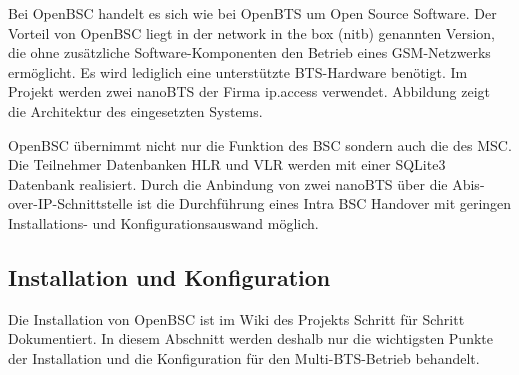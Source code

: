 \label{sec:openbsc}

Bei OpenBSC handelt es sich wie bei OpenBTS um Open Source Software. Der Vorteil von OpenBSC liegt in der network in the box (nitb) genannten Version, die ohne zusätzliche Software-Komponenten den Betrieb eines GSM-Netzwerks ermöglicht. Es wird lediglich eine unterstützte BTS-Hardware benötigt. Im Projekt werden zwei nanoBTS der Firma ip.access verwendet. Abbildung zeigt die Architektur des eingesetzten Systems.



OpenBSC übernimmt nicht nur die Funktion des BSC sondern auch die des MSC. Die Teilnehmer Datenbanken HLR und VLR werden mit einer SQLite3 Datenbank realisiert. Durch die Anbindung von zwei nanoBTS über die Abis-over-IP-Schnittstelle ist die Durchführung eines Intra BSC Handover mit geringen Installations- und Konfigurationsauswand möglich.

\subsection{Installation und Konfiguration}

Die Installation von OpenBSC ist im Wiki des Projekts Schritt für Schritt Dokumentiert. In diesem Abschnitt werden deshalb nur die wichtigsten Punkte der Installation und die Konfiguration für den Multi-BTS-Betrieb behandelt.


